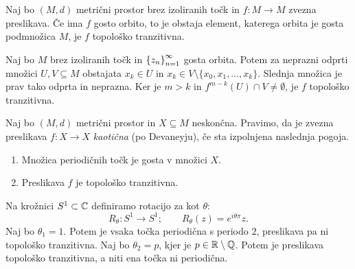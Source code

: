 \begin{trditev}
    Naj bo \((M, d)\) metrični prostor brez izoliranih točk in \(f \colon M \to M\) zvezna preslikava. Če ima \(f\) gosto orbito, to je obstaja element, katerega orbita je gosta podmnožica \(M\), je \(f\) topološko tranzitivna.
\end{trditev}

\begin{dokaz}
    Naj bo \(M\) brez izoliranih točk in \(\left\{ z_n \right\}_{n = 1}^{\infty}\) gosta orbita. Potem za neprazni odprti množici \(U, V \subseteq M\) obstajata \(x_k \in U\) in \(x_k \in V \setminus \{x_0, x_1, \dots, x_k\}\). Slednja množica je prav tako odprta in neprazna. Ker je \(m > k\) in \(f^{m - k} (U) \cap V \neq \emptyset\), je \(f\) topološko tranzitivna.

\end{dokaz}

\begin{definicija}
    Naj bo \((M, d)\) metrični prostor in \(X \subseteq M\) neskončna. Pravimo, da je zvezna preslikava \(f \colon X \to X\) \emph{kaotična} (po Devaneyju), če sta izpolnjena naslednja pogoja.
    \begin{enumerate}
        \item Množica periodičnih točk je gosta v množici \(X\).
        \item Preslikava \(f\) je topološko tranzitivna.
    \end{enumerate}
\end{definicija}

\begin{zgled}
    Na krožnici \(S^1 \subset \mathbb C\) definiramo rotacijo za kot \(\theta\):
    \[R_\theta \colon S^1 \to S^1; \qquad R_\theta (z) = e^{i \theta \pi} z.\]
    Naj bo \(\theta_1 = 1\). Potem je vsaka točka periodična s periodo \(\num{2}\), preslikava pa ni topološko  tranzitivna. Naj bo \(\theta_2 = p\), kjer je \(p \in \mathbb R \setminus \mathbb Q\). Potem je preslikava topološko tranzitivna, a niti ena točka ni periodična.
\end{zgled}

